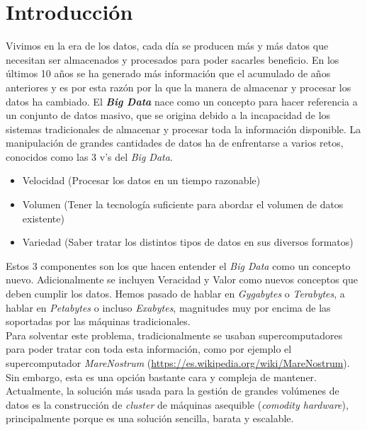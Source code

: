 \chapter*{Introducción}%

Vivimos en la era de los datos, cada día se producen más y más datos que
necesitan ser almacenados y procesados para poder sacarles beneficio.
En los últimos 10 años se ha generado más información que el acumulado de años
anteriores y es por esta razón  por la que la manera de almacenar y procesar
los datos ha cambiado.
El \textbf{\textit{Big Data}}\label{big_data_def} nace como un concepto para hacer referencia a un 
conjunto de datos masivo, que se origina debido a la incapacidad de los sistemas tradicionales 
de almacenar y procesar toda la información disponible.
La manipulación de grandes cantidades de datos ha de enfrentarse a varios
retos, conocidos como las 3 v's del \textit{Big Data}.
\begin{itemize}
  \item Velocidad (Procesar los datos en un tiempo razonable)
  \item Volumen (Tener la tecnología suficiente para abordar el volumen de datos existente)
  \item Variedad (Saber tratar los distintos tipos de datos en sus diversos formatos)
\end{itemize}
Estos 3 componentes son los que hacen entender el \textit{Big Data} como un 
concepto nuevo. Adicionalmente se incluyen Veracidad y Valor como nuevos conceptos que deben cumplir los datos.
Hemos pasado de hablar en \textit{Gygabytes} o \textit{Terabytes}, a hablar 
en \textit{Petabytes} o incluso \textit{Exabytes}, magnitudes muy por encima de las soportadas 
por las máquinas tradicionales.\\
Para solventar este problema, tradicionalmente se usaban supercomputadores para poder tratar con toda esta
información, como por ejemplo el supercomputador \textit{MareNostrum} (\url{https://es.wikipedia.org/wiki/MareNostrum}). 
Sin embargo, esta es una opción bastante cara y compleja de mantener. Actualmente, la solución más
usada para la gestión de grandes volúmenes de datos es la construcción de \textit{cluster} de máquinas asequible
(\textit{comodity hardware}), principalmente porque es una solución sencilla, barata y
escalable.

